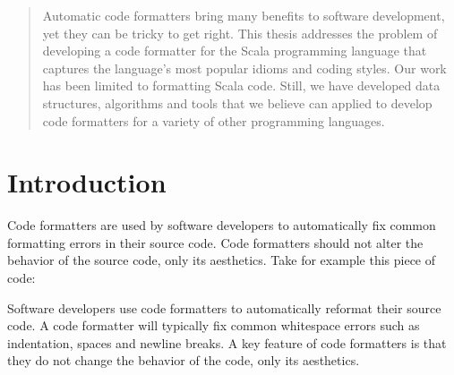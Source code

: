 \documentclass[11pt,a4paper]{article}
\begin{document}






\begin{abstract}
  Automatic code formatters bring many benefits to software development, yet they can be tricky to get right.
  This thesis addresses the problem of developing a code formatter for the
  Scala programming language that captures the language's most popular idioms
  and coding styles.
  Our work has been limited to formatting Scala code.
  Still, we have developed data structures, algorithms and tools that we
  believe can applied to develop code formatters for a variety of other
  programming languages.
\end{abstract}
\tableofcontents
% 
\pagebreak
\section{Introduction} %
\label{sec:Introduction}
\lstset{style=scala}

Code formatters are used by software developers to automatically fix common formatting errors in their source code.
Code formatters should not alter the behavior of the source code, only its aesthetics.
Take for example this piece of code:







Software developers use code formatters to automatically reformat their source code.
A code formatter will typically fix common whitespace errors such as indentation, spaces and newline breaks.
A key feature of code formatters is that they do not change the behavior of the code, only its aesthetics.
\end{document}
